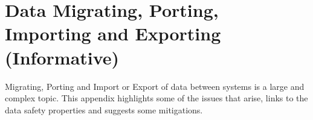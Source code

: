 %
\section{Data Migrating, Porting, Importing and Exporting (Informative)}\label{bkm:migration}
%

Migrating, Porting and Import or Export of data between systems is a large and complex topic.
This appendix highlights some of the issues that arise, links to the data safety properties and suggests some mitigations.

